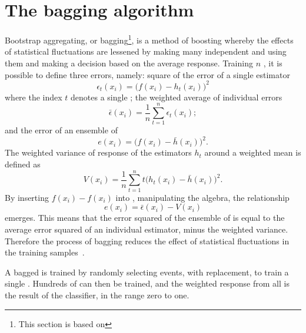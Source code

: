 \section{The bagging algorithm}
\label{sec:bdt:bag}
Bootstrap aggregating, or bagging\footnote{
  This section is based on }, is a method of boosting whereby the effects of
statistical fluctuations are lessened by making many independent \DTs and using them
and making a decision based on the average response.
Training $n$ \DTs, it is possible to define three errors, namely:
square of the error of a single estimator
\begin{equation}
  \epsilon_t(x_i) = \big(f(x_i)-h_t(x_i)\big)^2
  \label{eq:bdt:bag1}
\end{equation}
where the index $t$ denotes a single \DT;
the weighted average of individual errors
\begin{equation}
  \bar\epsilon(x_i) = \frac1n\sum_{t=1}^n\epsilon_t(x_i);
  \label{eq:bdt:bag2}
\end{equation}
and the error of an ensemble of \DTs
\begin{equation}
  e(x_i) = \big(f(x_i)-\bar h(x_i)\big)^2.
  \label{eq:bdt:bag3}
\end{equation}
The weighted variance of response of the estimators $h_t$ around a weighted mean is defined as
\begin{equation}
  V(x_i) = \frac1n\sum_{t=1}^nt\big(h_t(x_i) - \bar h(x_i)\big)^2.
  \label{eq:bdt:bag4}
\end{equation}
By inserting $f(x_i)-f(x_i)$ into , manipulating the algebra, the relationship
\begin{equation}
  e(x_i) = \bar\epsilon(x_i) - V(x_i)
  \label{eq:bdt:bag5}
\end{equation}
emerges.
This means that the error squared of the ensemble of \DTs is equal to the average error squared of an
individual estimator, minus the weighted variance.
Therefore the process of bagging reduces the
effect of statistical fluctuations in the training samples~\cite{Krogh95neuralnetwork}.

A bagged \BDT is trained by randomly selecting events, with replacement, to train a single \DT.
Hundreds of \DTs can then be trained, and the weighted response from all \DTs is the result of the
classifier, in the range zero to one.





